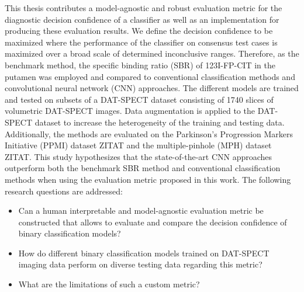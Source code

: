 This thesis contributes a model-agnostic and robust evaluation metric for the diagnostic decision confidence of a classifier 
as well as an implementation for producing these evaluation results.
We define the decision confidence to be maximized where the performance of the classifier on consensus test cases 
is maximized over a broad scale of determined inconclusive ranges.
Therefore, as the benchmark method, the specific binding ratio (SBR) of 123I-FP-CIT in the putamen was employed and 
compared to conventional classification methods and convolutional neural network (CNN) approaches.
The different models are trained and tested on subsets of a DAT-SPECT dataset consisting of 1740 slices of 
volumetric DAT-SPECT images.
Data augmentation is applied to the DAT-SPECT dataset to increase the heterogeneity of the training and testing data.
Additionally, the methods are evaluated on the Parkinson's Progression Markers Initiative (PPMI) dataset ZITAT and 
the multiple-pinhole (MPH) dataset ZITAT.
This study hypothesizes that the state-of-the-art CNN approaches outperform both the benchmark SBR method and conventional 
classification methods when using the evaluation metric proposed in this work.
The following research questions are addressed: 
\begin{itemize}
    \item Can a human interpretable and model-agnostic evaluation metric be constructed that allows 
    to evaluate and compare the decision confidence of binary classification models?
    \item How do different binary classification models trained on DAT-SPECT imaging data perform on 
    diverse testing data regarding this metric? 
    \item What are the limitations of such a custom metric?
\end{itemize}





